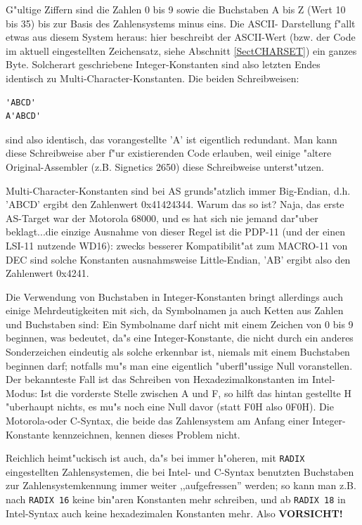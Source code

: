 \documentclass[12pt,a4paper,twoside]{report}
\newcommand{\asname}{AS}
\begin{document}
G"ultige Ziffern sind die Zahlen 0 bis 9 sowie die Buchstaben A bis Z
(Wert 10 bis 35) bis zur Basis des Zahlensystems minus eins.  Die ASCII-
Darstellung f"allt etwas aus diesem System heraus: hier beschreibt der
ASCII-Wert (bzw. der Code im aktuell eingestellten Zeichensatz, siehe
Abschnitt \ref{SectCHARSET}) ein ganzes Byte.  Solcherart geschriebene
Integer-Konstanten sind also letzten Endes identisch zu Multi-Character-Konstanten.
Die beiden Schreibweisen:
\begin{verbatim}
'ABCD'
A'ABCD'
\end{verbatim}
sind also identisch, das vorangestellte 'A' ist eigentlich redundant.  Man
kann diese Schreibweise aber f"ur existierenden Code erlauben, weil einige "altere
Original-Assembler (z.B. Signetics 2650) diese Schreibweise unterst"utzen.

Multi-Character-Konstanten sind bei \asname{} grunds"atzlich immer Big-Endian,
d.h. 'ABCD' ergibt den Zahlenwert 0x41424344.  Warum das so ist? Naja,
das erste \asname{}-Target war der Motorola 68000, und es hat sich nie jemand
dar"uber beklagt...die einzige Ausnahme von
dieser Regel ist die PDP-11 (und der einen LSI-11 nutzende WD16):  zwecks
besserer Kompatibilit"at zum MACRO-11 von DEC sind solche Konstanten
ausnahmsweise Little-Endian, 'AB' ergibt also den Zahlenwert 0x4241.

Die Verwendung von Buchstaben in Integer-Konstanten bringt allerdings auch
einige Mehrdeutigkeiten mit sich, da Symbolnamen ja auch Ketten aus Zahlen
und Buchstaben sind: Ein Symbolname darf nicht mit einem Zeichen von 0 bis
9 beginnen, was bedeutet, da"s eine Integer-Konstante, die nicht durch ein
anderes Sonderzeichen eindeutig als solche erkennbar ist, niemals mit
einem Buchstaben beginnen darf; notfalls mu"s man eine eigentlich
"uberfl"ussige Null voranstellen.  Der bekannteste Fall ist das Schreiben
von Hexadezimalkonstanten im Intel-Modus: Ist die vorderste Stelle
zwischen A und F, so hilft das hintan gestellte H "uberhaupt nichts, es
mu"s noch eine Null davor (statt F0H also 0F0H).  Die Motorola-oder
C-Syntax, die beide das Zahlensystem am Anfang einer Integer-Konstante
kennzeichnen, kennen dieses Problem nicht.

Reichlich heimt"uckisch ist auch, da"s bei immer h"oheren, mit {\tt RADIX}
eingestellten Zahlensystemen, die bei Intel- und C-Syntax benutzten
Buchstaben zur Zahlensystemkennung immer weiter ,,aufgefressen'' werden; so
kann man z.B. nach {\tt RADIX 16} keine bin"aren Konstanten mehr
schreiben, und ab {\tt RADIX 18} in Intel-Syntax auch keine hexadezimalen
Konstanten mehr.  Also {\bf VORSICHT!}
\end{document}
